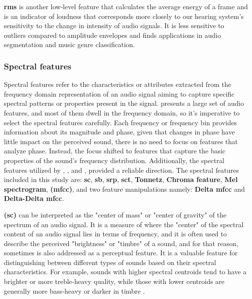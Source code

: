 \textbf{\gls{rms}} is another low-level feature that calculates the average energy of a frame and is an indicator of loudness that corresponds more closely to our hearing system’s sensitivity to the change in intensity of audio signals. It is less sensitive to outliers compared to amplitude envelopes and finds applications in audio segmentation and music genre classification. 


\subsubsection{Spectral features}
\label{subsubsec:spectral_fatures}

Spectral features refer to the characteristics or attributes extracted from the frequency domain representation of an audio signal aiming to capture specific spectral patterns or properties present in the signal. \textcite{Peeters2004} presents a large set of audio features, and most of them dwell in the frequency domain, so it's imperative to select the spectral features carefully. Each frequency or frequency bin provides information about its magnitude and phase, given that changes in phase have little impact on the perceived sound, there is no need to focus on features that analyze phase. Instead, the focus shifted to features that capture the basic properties of the sound's frequency distribution. Additionally, the spectral features utilized by \textcite{Lhoest2021}, \textcite{Silva2019}, and \textcite{Bountourakis2015}, provided a reliable direction. The spectral features included in this study are: \textbf{\gls{sc}}, \textbf{\gls{sb}}, \textbf{\gls{srp}}, \textbf{\gls{sct}}, \textbf{Tonnetz}, \textbf{Chroma feature}, \textbf{Mel spectrogram}, \textbf{ (\gls{mfcc})}, and two feature manipulations namely: \textbf{Delta \gls{mfcc}} and \textbf{Delta-Delta \gls{mfcc}}.

\textbf{ (\gls{sc})} can be interpreted as the "center of mass" or "center of gravity" of the spectrum of an audio signal. It is a measure of where the "center" of the spectral content of an audio signal lies in terms of frequency, and it is often used to describe the perceived "brightness" or "timbre" of a sound, and for that reason, sometimes is also addressed as a perceptual feature. It is a valuable feature for distinguishing between different types of sounds based on their spectral characteristics. %
For example, sounds with higher spectral centroids tend to have a brighter or more treble-heavy quality, while those with lower centroids are generally more bass-heavy or darker in timbre \cite{Park2008}.

